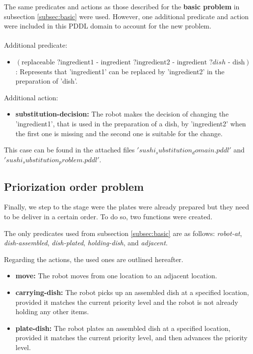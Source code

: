 The same predicates and actions as those described for the \textbf{basic problem} in subsection \ref{subsec:basic} were used. 
However, one additional predicate and action were included in this PDDL domain to account for the new problem.
\\ \\ 
Additional predicate:
\begin{itemize}
  \item $ (\text{replaceable } ? \text{ingredient1 - ingredient }  ? \text{ingredient2 - ingredient }  ?dish  \text{ - dish}) $: Represents that 'ingredient1' can be replaced by 'ingredient2' in the preparation of 'dish'.
\end{itemize}
Additional action:
\begin{itemize}
  \item \textbf{substitution-decision:} The robot makes the decision of changing the 'ingredient1', that is used in the preparation of 
  a dish, by 'ingredient2' when the first one is missing and the second one is suitable for the change.
\end{itemize}

This case can be found in the attached files $'sushi_substitution_domain.pddl'$ and $'sushi_substitution_problem.pddl'$.

\subsection{Priorization order problem}

Finally, we step to the stage were the plates were already prepared but they need to be deliver in a certain order. To do so, two 
functions were created. 

The only predicates used from subsection \ref{subsec:basic} are as follows: \textit{robot-at}, \textit{dish-assembled}, 
\textit{dish-plated}, \textit{holding-dish}, and \textit{adjacent}. 

Regarding the actions, the used ones are outlined hereafter.
\begin{itemize}
    \item \textbf{move:} The robot moves from one location to an adjacent location.
    \item \textbf{carrying-dish:} The robot picks up an assembled dish at a specified location, provided it matches the current priority level and the robot is not already holding any other items.
    \item \textbf{plate-dish:} The robot plates an assembled dish at a specified location, provided it matches the current priority level, and then advances the priority level.
\end{itemize}


